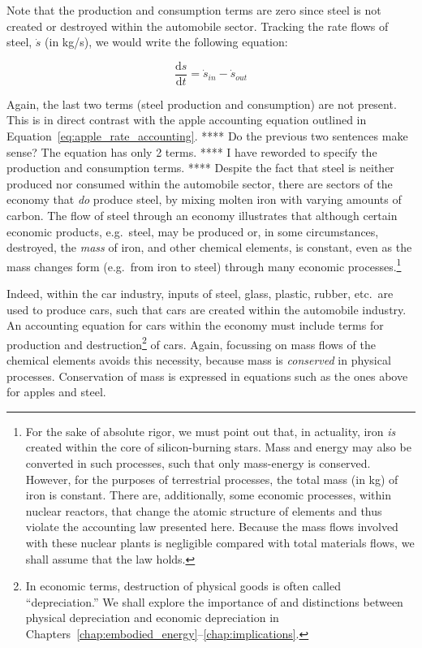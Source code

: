 Note that the production and consumption terms are zero
since steel is not created or destroyed within the automobile
sector. Tracking the rate flows of steel, 
$\dot{s}$ (in kg/s),
we would write the following equation:

\begin{equation}
	\frac{\mathrm{d}s}{\mathrm{d}t}
	= \dot{s}_{in}
	- \dot{s}_{out}
\end{equation}

Again, the last two terms (steel production and consumption) are not present. 
This is in direct contrast with the apple 
accounting equation outlined in Equation~\ref{eq:apple_rate_accounting}. 
**** Do the previous two sentences make sense?
The equation has only 2 terms. **** 
I have reworded to specify the production and consumption terms. ****
Despite the fact that steel is neither produced nor consumed within the automobile sector, 
there are sectors of the economy that \emph{do} produce steel,
by mixing molten iron with varying amounts of carbon. 
The flow of steel through an economy illustrates that although certain economic
products, e.g.\ steel, may be produced or, in some circumstances, destroyed, the
\emph{mass} of iron, and other chemical elements, is constant,
even as the mass changes form (e.g.\ from iron to steel) 
through many economic processes.\footnote{For the sake of
absolute rigor, we must point out that, in actuality, iron \emph{is} created within
the core of silicon-burning stars. Mass and energy may also be converted in such processes, 
such that only mass-energy is conserved. However, for the purposes of terrestrial
processes, the total mass (in kg) of iron is constant. There are, additionally, some economic
processes, within nuclear reactors, that change the atomic structure of elements
and thus violate the accounting law presented here. Because the mass flows involved
with these nuclear plants is negligible compared with total materials flows, we
shall assume that the law holds.}


Indeed, within the car industry, inputs of steel, glass, plastic, rubber, etc.\ are used
to produce cars, such that cars are created within the automobile industry. 
An accounting equation for cars within the economy
must include terms for production and destruction\footnote{In economic terms,
destruction of physical goods is often called ``depreciation.'' We shall 
explore the importance of and distinctions between 
physical depreciation and economic depreciation 
in Chapters~\ref{chap:embodied_energy}--\ref{chap:implications}.}
of cars.
Again, focussing on mass flows of the chemical elements avoids this necessity, 
because mass is \emph{conserved} in physical processes. 
Conservation of mass is expressed in equations such as the ones above
for apples and steel. 

